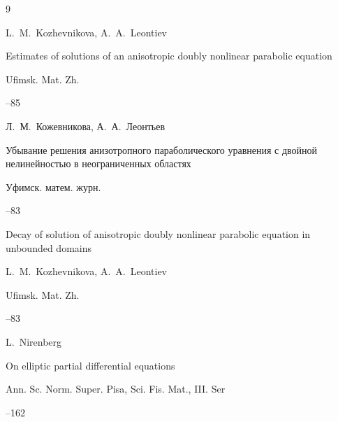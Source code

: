 \begin{thebibliography}{9}
\misctransl

\by L.~M.~Kozhevnikova, A.~A.~Leontiev

\paper Estimates of solutions of an anisotropic doubly nonlinear parabolic equation

\jour Ufimsk. Mat. Zh.




--85






\by Л.~М.~Кожевникова, А.~А.~Леонтьев 

\paper Убывание решения анизотропного параболического уравнения с двойной нелинейностью в неограниченных областях

\jour Уфимск. матем. журн.




--83

\misctransl

\paper Decay of solution of anisotropic doubly nonlinear parabolic equation in unbounded domains

\by L.~M.~Kozhevnikova, A.~A.~Leontiev 

\jour Ufimsk. Mat. Zh.




--83










\by L.~Nirenberg

\paper On elliptic partial differential equations

\jour Ann. Sc. Norm. Super. Pisa, Sci. Fis. Mat., III. Ser



--162





\end{thebibliography}





